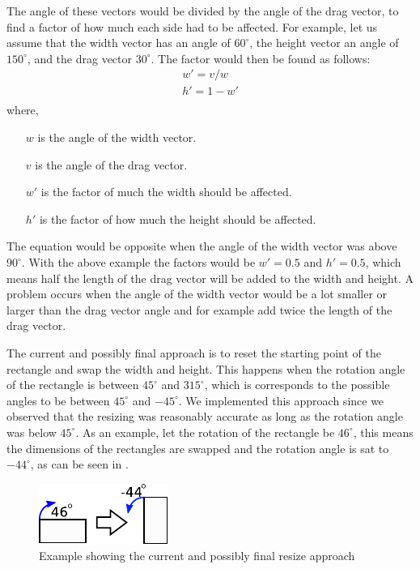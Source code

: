 The angle of these vectors would be divided by the angle of the drag vector, to find a factor of how much each side had to be affected.
For example, let us assume that the width vector has an angle of $60^\circ$, the height vector an angle of $150^\circ$, and the drag vector $30^\circ$.
The factor would then be found as follows:
\begin{equation}
\begin{aligned}
w' = v / w\\
h' = 1 - w'\\
\end{aligned}
\end{equation}
where, 
\begin{itemize}
\item[$w$] is the angle of the width vector.
\item[$v$] is the angle of the drag vector.
\item[$w'$] is the factor of much the width should be affected.
\item[$h'$] is the factor of how much the height should be affected.
\end{itemize}
The equation would be opposite when the angle of the width vector was above $90^\circ$.
With the above example the factors would be $w' = 0.5$ and $h' = 0.5$, which means half the length of the drag vector will be added to the width and height.
A problem occurs when the angle of the width vector would be a lot smaller or larger than the drag vector angle and for example add twice the length of the drag vector.

The current and possibly final approach is to reset the starting point of the rectangle and swap the width and height.
This happens when the rotation angle of the rectangle is between $45^\circ$ and $315^\circ$, which is corresponds to the possible angles to be between $45^\circ$ and $-45^\circ$.
We implemented this approach since we observed that the resizing was reasonably accurate as long as the rotation angle was below $45^\circ$.
As an example, let the rotation of the rectangle be $46^\circ$, this means the dimensions of the rectangles are swapped and the rotation angle is sat to $-44^\circ$, as can be seen in .
\begin{figure}
\includegraphics[scale=0.5]{media/sprint3/approach6}
\caption{Example showing the current and possibly final resize approach}
\label{fig:app6}
\end{figure}
